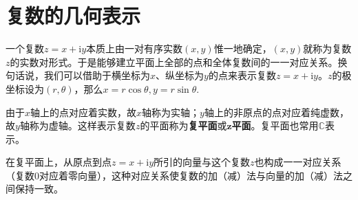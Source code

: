 \documentclass[../../main.tex]{subfiles}%
\begin{document}
\section{复数的几何表示}\label{section:复数的几何表示}

\begin{definition}
一个复数$z=x+\mathrm{i}y$本质上由一对有序实数$(x,y)$惟一地确定，$(x,y)$就称为复数$z$的实数对形式。于是能够建立平面上全部的点和全体复数间的一一对应关系。换句话说，我们可以借助于横坐标为$x$、纵坐标为$y$的点来表示复数$z=x+\mathrm{i}y$。$z$的极坐标设为\((r,\theta)\)，那么$x = r\cos\theta,y = r\sin\theta.$

由于$x$轴上的点对应着实数，故$x$轴称为实轴；$y$轴上的非原点的点对应着纯虚数，故$y$轴称为虚轴。这样表示复数$z$的平面称为\textbf{复平面}或$\boldsymbol{z}$\textbf{平面}。复平面也常用$\mathbb{C}$表示。

在复平面上，从原点到点$z=x+\mathrm{i}y$所引的向量与这个复数$z$也构成一一对应关系（复数$0$对应着零向量），这种对应关系使复数的加（减）法与向量的加（减）法之间保持一致。
\end{definition}
\end{document}

